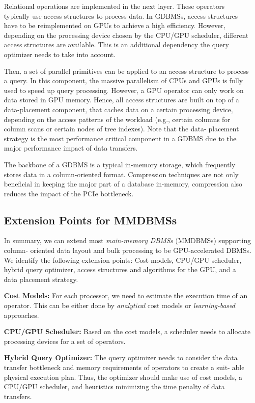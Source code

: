 \documentclass[twocolumn]{article}
\begin{document}
Relational operations are implemented in the next layer. These operators typically use access structures to process data. In GDBMSs, access structures have to be reimplemented on GPUs to achieve a high efficiency. However, depending
on the processing device chosen by the CPU/GPU scheduler, different access structures are available. This is an additional dependency the query optimizer needs to take into account.

Then, a set of parallel primitives can be applied to an access structure to process a query. In this component, the massive parallelism of CPUs and GPUs is fully used to speed up query processing. However, a GPU operator can only work on data stored in GPU memory. Hence, all access structures are built on top of a data-placement component, that caches data on a certain processing device, depending on the access patterns of the workload (e.g., certain columns for column scans or certain nodes of tree indexes). Note that the data- placement strategy is the most performance critical component in a GDBMS due to the major performance impact of data transfers.

The backbone of a GDBMS is a typical in-memory storage, which frequently stores data in a column-oriented format. Compression techniques are not only beneficial in keeping the major part of a database in-memory, compression also reduces the impact of the PCIe bottleneck.

\subsection{Extension Points for MMDBMSs}
In summary, we can extend most \textit{main-memory DBMSs} (MMDBMSs) supporting column- oriented data layout and bulk processing to be GPU-accelerated DBMSs. 
We identify the following extension points: Cost models, CPU/GPU scheduler, hybrid query optimizer, access structures and algorithms for the GPU, and a data placement strategy.

\noindent
\textbf{Cost Models:} For each processor, we need to estimate the execution time of an operator. This can be either done by \textit{analytical} cost models or \textit{learning-based} approaches.

\noindent
\textbf{CPU/GPU Scheduler:} Based on the cost models, a scheduler needs to allocate processing devices for a set of operators.

\noindent
\textbf{Hybrid Query Optimizer:} The query optimizer needs to consider the data transfer bottleneck and memory requirements of operators to create a suit- able physical execution plan. Thus, the optimizer should make use of cost models, a CPU/GPU scheduler, and heuristics minimizing the time penalty of data transfers.
\end{document}
